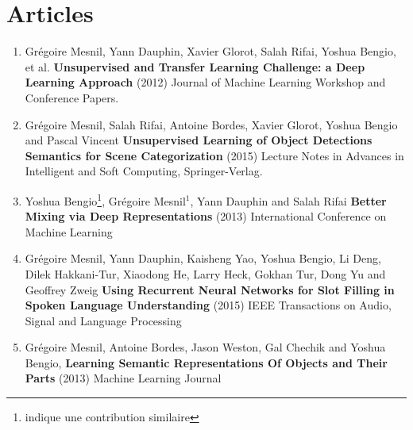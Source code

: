 \chapter*{Articles}

\begin{enumerate}

\item Grégoire Mesnil, Yann Dauphin, Xavier Glorot, Salah Rifai, Yoshua Bengio,
et al. {\bf Unsupervised and Transfer Learning Challenge: a Deep Learning
Approach} (2012) Journal of Machine Learning Workshop and Conference Papers.

\item Grégoire Mesnil, Salah Rifai, Antoine Bordes, Xavier Glorot, Yoshua Bengio and Pascal Vincent
{\bf Unsupervised Learning of Object Detections Semantics for Scene Categorization}
(2015) Lecture Notes in Advances in Intelligent and Soft Computing, Springer-Verlag.

\item Yoshua Bengio\footnote{indique une contribution similaire}, Grégoire Mesnil$^{1}$, Yann Dauphin and Salah Rifai
{\bf Better Mixing via Deep Representations} (2013) International
Conference on Machine Learning

\item Grégoire Mesnil, Yann Dauphin, Kaisheng Yao, Yoshua Bengio, Li Deng, Dilek Hakkani-Tur, Xiaodong He, Larry Heck, Gokhan Tur, Dong Yu and Geoffrey Zweig {\bf Using Recurrent Neural Networks for Slot Filling in Spoken Language Understanding} (2015) IEEE Transactions on Audio, Signal and Language Processing

\item Grégoire Mesnil, Antoine Bordes, Jason Weston,
Gal Chechik and Yoshua Bengio, {\bf Learning Semantic Representations Of
Objects and Their Parts} (2013) Machine Learning Journal

\end{enumerate}
